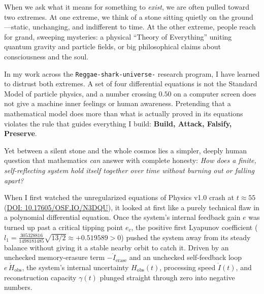 \documentclass[11pt,a4paper]{article}
\theoremstyle{definition}
\begin{document}
When we ask what it means for something to \emph{exist}, we are often pulled toward two extremes. At one extreme, we think of a stone sitting quietly on the ground---static, unchanging, and indifferent to time. At the other extreme, people reach for grand, sweeping mysteries: a physical ``Theory of Everything'' uniting quantum gravity and particle fields, or big philosophical claims about consciousness and the soul.

In my work across the \texttt{Reggae-shark-universe-} research program, I have learned to distrust both extremes. A set of four differential equations is not the Standard Model of particle physics, and a number crossing $0.50$ on a computer screen does not give a machine inner feelings or human awareness. Pretending that a mathematical model does more than what is actually proved in its equations violates the rule that guides everything I build: \textbf{Build, Attack, Falsify, Preserve}.

Yet between a silent stone and the whole cosmos lies a simpler, deeply human question that mathematics \emph{can} answer with complete honesty: \emph{How does a finite, self-reflecting system hold itself together over time without burning out or falling apart?}

When I first watched the unregularized equations of Physics v1.0 crash at $t \approx 55$ (\href{https://doi.org/10.17605/OSF.IO/N3DQU}{DOI: 10.17605/OSF.IO/N3DQU}), it looked at first like a purely technical flaw in a polynomial differential equation. Once the system's internal feedback gain $e$ was turned up past a critical tipping point $e_c$, the positive first Lyapunov coefficient ($l_1 = \frac{305328816}{1498181485}\sqrt{13/2} \approx +0.519589 > 0$) pushed the system away from its steady balance without giving it a stable nearby orbit to catch it. Driven by an unchecked memory-erasure term $-\dot{I}_{\mathrm{erase}}$ and an unchecked self-feedback loop $e\,\dot{H}_{\mathrm{obs}}$, the system's internal uncertainty $H_{\mathrm{obs}}(t)$, processing speed $\dot{I}(t)$, and reconstruction capacity $\gamma(t)$ plunged straight through zero into negative numbers.
\end{document}
